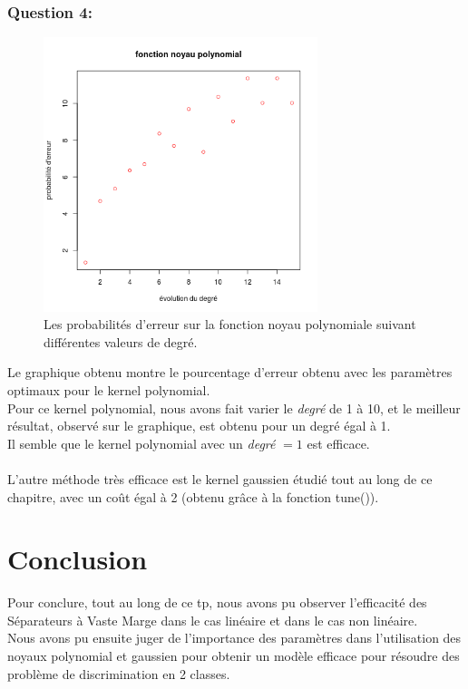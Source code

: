 \documentclass[a4paper, 10pt]{article}
\begin{document}
\subsubsection*{Question 4:}

\begin{figure}[h!]
	\centering
  \includegraphics[height = 8cm, width = 8cm]{plots/ex4_q4_polynomial.png}
  \caption{Les probabilités d'erreur sur la fonction noyau polynomiale suivant différentes valeurs de degré.}
\end{figure}
\noindent
Le graphique obtenu montre le pourcentage d’erreur obtenu avec les paramètres optimaux pour le kernel polynomial.\\
Pour ce kernel polynomial, nous avons fait varier le \textit{degré} de 1 à 10, et le meilleur résultat, observé sur le graphique, est obtenu pour un degré égal à 1.\\
Il semble que le kernel polynomial avec un \textit{degré} $= 1$ est efficace.\\ \\
L’autre méthode très efficace est le kernel gaussien étudié tout au
long de ce chapitre, avec un coût égal à 2 (obtenu grâce à la fonction tune()).

\section*{Conclusion}

Pour conclure, tout au long de ce tp, nous avons pu observer l'efficacité des Séparateurs à Vaste Marge dans le cas linéaire et dans le cas non linéaire.\\
Nous avons pu ensuite juger de l'importance des paramètres dans l'utilisation des noyaux polynomial et gaussien pour obtenir un modèle efficace pour résoudre des problème de discrimination en 2 classes. 
\end{document}
